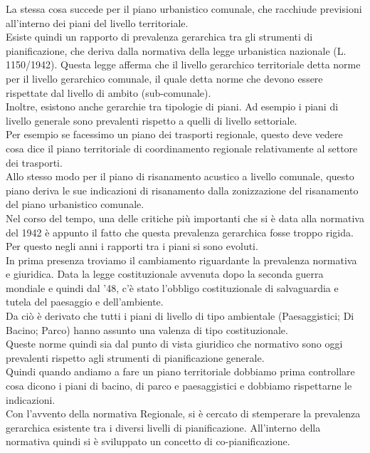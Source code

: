 \documentclass[a4paper,12pt, oneside]{book}
\begin{document}
La stessa cosa succede per il piano urbanistico comunale, che racchiude previsioni all'interno dei piani del livello territoriale.\\
Esiste quindi un rapporto di prevalenza gerarchica tra gli strumenti di pianificazione, che deriva dalla normativa della legge urbanistica nazionale (L. 1150/1942). Questa legge afferma che il livello gerarchico territoriale detta norme per il livello gerarchico comunale, il quale detta norme che devono essere rispettate dal livello di ambito (sub-comunale).\\
Inoltre, esistono anche gerarchie tra tipologie di piani. Ad esempio i piani di livello generale sono prevalenti rispetto a quelli di livello settoriale.\\
Per esempio se facessimo un piano dei trasporti regionale, questo deve vedere cosa dice il piano territoriale di coordinamento regionale relativamente al settore dei trasporti.\\
Allo stesso modo per il piano di risanamento acustico a livello comunale, questo piano deriva le sue indicazioni di risanamento dalla zonizzazione del risanamento del piano urbanistico comunale.\\
Nel corso del tempo, una delle critiche più importanti che si è data alla normativa del 1942 è appunto il fatto che questa prevalenza gerarchica fosse troppo rigida. Per questo negli anni i rapporti tra i piani si sono evoluti.\\
In prima presenza troviamo il cambiamento riguardante la prevalenza normativa e giuridica. Data la legge costituzionale avvenuta dopo la seconda guerra mondiale e quindi dal '48, c'è stato l'obbligo costituzionale di salvaguardia e tutela del paesaggio e dell'ambiente.\\
Da ciò è derivato che tutti i piani di livello di tipo ambientale (Paesaggistici; Di Bacino; Parco) hanno assunto una valenza di tipo costituzionale.\\
Queste norme quindi sia dal punto di vista giuridico che normativo sono oggi prevalenti rispetto agli strumenti di pianificazione generale.\\
Quindi quando andiamo a fare un piano territoriale dobbiamo prima controllare cosa dicono i piani di bacino, di parco e paesaggistici e dobbiamo rispettarne le indicazioni.\\
Con l'avvento della normativa Regionale, si è cercato di stemperare la prevalenza gerarchica esistente tra i diversi livelli di pianificazione. All'interno della normativa quindi si è sviluppato un concetto di co-pianificazione.\\
\end{document}
